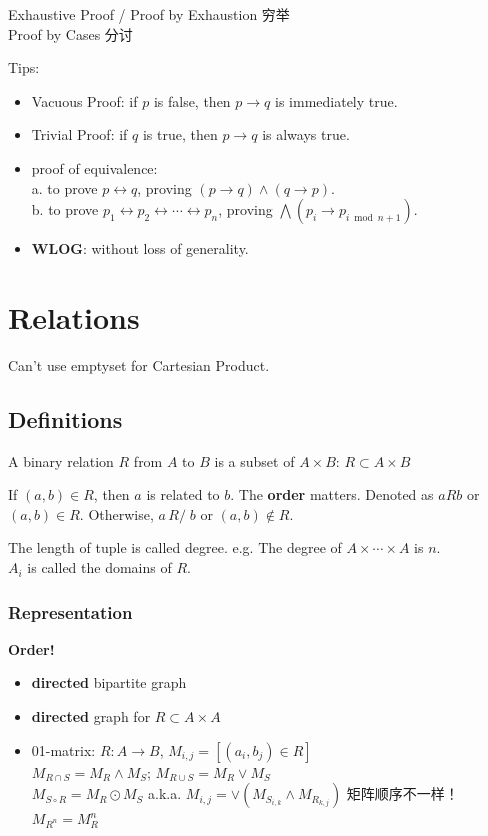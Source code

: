 \documentclass[12pt, a4paper, UTF8, openany]{ctexbook}
\newcommand{\bi}{\leftrightarrow} %
\newcommand{\bigand}{\bigwedge}
\begin{document}
    Exhaustive Proof / Proof by Exhaustion 穷举 \\
    Proof by Cases 分讨

    Tips:
    \begin{itemize}
        \item Vacuous Proof: if $p$ is false, then $p \to q$ is immediately true.
        \item Trivial Proof: if $q$ is true, then $p \to q$ is always true.
        \item proof of equivalence: \\
            a. to prove $p \bi q$, proving $(p \to q) \land (q \to p)$. \\
            b. to prove $p_1 \bi p_2 \bi \cdots \bi p_n$, proving $\bigand (p_i \to p_{i \bmod n + 1})$.
        \item \textbf{WLOG}: without loss of generality.
    \end{itemize}

\chapter{Relations}
Can't use emptyset for {\heiti Cartesian Product}.

    \section{Definitions}
    A binary relation $R$ from $A$ to $B$ is a subset of $A \times B$: $R \subset A \times B$

    If $(a, b) \in R$, then $a$ is related to $b$. The \textbf{order} matters. Denoted as $a R b$ or $(a, b) \in R$. 
    Otherwise, $a \, R\!\!\!\!/ \; b$ or $(a, b) \notin R$.

    The length of tuple is called {\heiti degree}. e.g. The degree of $A \times \cdots \times A$ is $n$.\\
    $A_i$ is called the domains of $R$.

    \subsection{Representation}
        \textbf{Order!}

        \begin{itemize}
            \item \textbf{directed} bipartite graph
            \item \textbf{directed} graph for $R \subset A \times A$
            \item 01-matrix: $R: A \to B$, $M_{i, j} = [(a_i, b_j) \in R]$ \\
                $M_{R \cap S} = M_R \land M_S$; $M_{R \cup S} = M_R \lor M_S$ \\
                $M_{S \circ R} = M_R \odot M_S$ a.k.a. $M_{i, j} = \lor (M_{S_{i, k}} \land M_{R_{k, j}})$ {\heiti 矩阵顺序不一样！}\\
                $M_{R^n} = M_R^n$
        \end{itemize}
\end{document}
